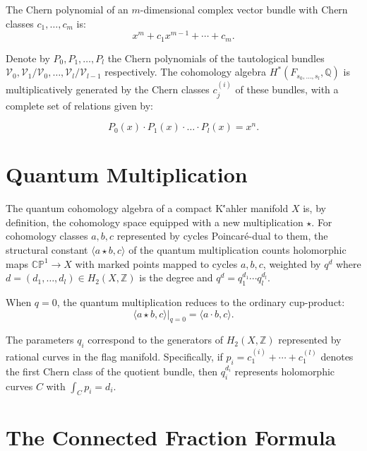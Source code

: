 The Chern polynomial of an $m$-dimensional complex vector bundle with Chern classes $c_1, \ldots, c_m$ is:
\begin{equation}
x^m + c_1 x^{m-1} + \cdots + c_m.
\end{equation}

\begin{sloppypar}
Denote by $P_0, P_1, \ldots, P_l$ the Chern polynomials of the tautological bundles $\mathcal{V}_0, \mathcal{V}_1/\mathcal{V}_0, \ldots, \mathcal{V}_l/\mathcal{V}_{l-1}$ respectively. The cohomology algebra $H^*(F_{s_0, \ldots, s_l}, \mathbb{Q})$ is multiplicatively generated by the Chern classes $c_j^{(i)}$ of these bundles, with a complete set of relations given by:
\end{sloppypar}
\begin{equation}
P_0(x) \cdot P_1(x) \cdot \ldots \cdot P_l(x) = x^n.
\label{eq:flag-relation}
\end{equation}

\section{Quantum Multiplication}

The quantum cohomology algebra of a compact K\''ahler manifold $X$ is, by definition, the cohomology space equipped with a new multiplication $\star$. For cohomology classes $a, b, c$ represented by cycles Poincar\'e-dual to them, the structural constant $\langle a \star b, c \rangle$ of the quantum multiplication counts holomorphic maps $\mathbb{CP}^1 \to X$ with marked points mapped to cycles $a, b, c$, weighted by $q^d$ where $d = (d_1, \ldots, d_l) \in H_2(X, \mathbb{Z})$ is the degree and $q^d = q_1^{d_1} \cdots q_l^{d_l}$.

\begin{Remark}
When $q = 0$, the quantum multiplication reduces to the ordinary cup-product:
\[
\langle a \star b, c \rangle|_{q=0} = \langle a \cdot b, c \rangle.
\]
\end{Remark}

The parameters $q_i$ correspond to the generators of $H_2(X, \mathbb{Z})$ represented by rational curves in the flag manifold. Specifically, if $p_i = c_1^{(i)} + \cdots + c_1^{(l)}$ denotes the first Chern class of the quotient bundle, then $q_i^{d_i}$ represents holomorphic curves $C$ with $\int_C p_i = d_i$.

\section{The Connected Fraction Formula}

